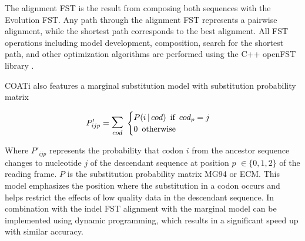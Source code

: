 The alignment FST is the result from composing both sequences with the Evolution
FST.
Any path through the alignment FST represents a pairwise alignment, while the
shortest path corresponds to the best alignment.
All FST operations including model development, composition, search for the
shortest path, and other optimization algorithms are performed using the C++
openFST library \parencite{allauzen2007openfst}.


COATi also features a marginal substitution model with substitution probability
matrix

\[P'_{ijp} = \mathlarger{\mathlarger{\sum}}_{cod} \thickspace \begin{cases}
P(i \thinspace | \thinspace cod) \enspace \text{if} \enspace cod_p = j\\
0 \enspace \text{otherwise}
\end{cases} \]

Where $P'_{ijp}$ represents the probability that codon $i$ from the ancestor
sequence changes to nucleotide $j$ of the descendant sequence at position $p$
$\in \{0, 1, 2\}$ of the reading frame.
$P$ is the substitution probability matrix MG94 or ECM.
This model emphasizes the position where the substitution in a codon occurs and
helps restrict the effects of low quality data in the descendant sequence.
In combination with the indel FST alignment with the marginal model can be
implemented using dynamic programming, which results in a significant speed up
with similar accuracy.

